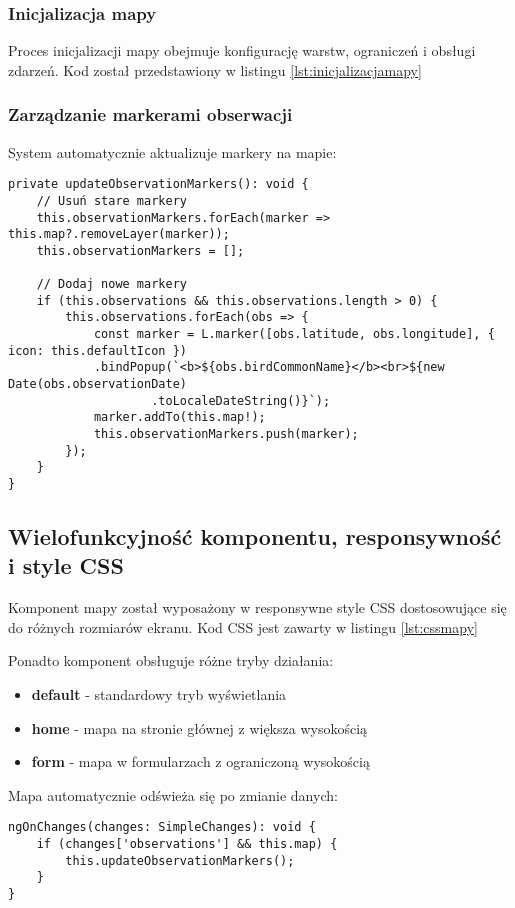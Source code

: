 \subsubsection{Inicjalizacja mapy}
Proces inicjalizacji mapy obejmuje konfigurację warstw, ograniczeń i obsługi zdarzeń.
Kod został przedstawiony w listingu \ref{lst:inicjalizacjamapy}

\subsubsection{Zarządzanie markerami obserwacji}
System automatycznie aktualizuje markery na mapie:

\begin{lstlisting}[style=tsstyle, caption={Parametry mapy}]
private updateObservationMarkers(): void {
	// Usuń stare markery
	this.observationMarkers.forEach(marker => this.map?.removeLayer(marker));
	this.observationMarkers = [];
	
	// Dodaj nowe markery
	if (this.observations && this.observations.length > 0) {
		this.observations.forEach(obs => {
			const marker = L.marker([obs.latitude, obs.longitude], { icon: this.defaultIcon })
			.bindPopup(`<b>${obs.birdCommonName}</b><br>${new Date(obs.observationDate)
					.toLocaleDateString()}`);
			marker.addTo(this.map!);
			this.observationMarkers.push(marker);
		});
	}
}
\end{lstlisting}

\subsection{Wielofunkcyjność komponentu, responsywność i style CSS}
Komponent mapy został wyposażony w responsywne style CSS dostosowujące się do różnych rozmiarów ekranu. Kod CSS jest zawarty w listingu \ref{lst:cssmapy}

Ponadto komponent obsługuje różne tryby działania:
\begin{itemize}
	\item \textbf{default} - standardowy tryb wyświetlania
	\item \textbf{home} - mapa na stronie głównej z większa wysokością
	\item \textbf{form} - mapa w formularzach z ograniczoną wysokością
\end{itemize}

Mapa automatycznie odświeża się po zmianie danych:

\begin{lstlisting}[style=tsstyle, caption={Funkcja odświeżania mapy}]
ngOnChanges(changes: SimpleChanges): void {
	if (changes['observations'] && this.map) {
		this.updateObservationMarkers();
	}
}
\end{lstlisting}

